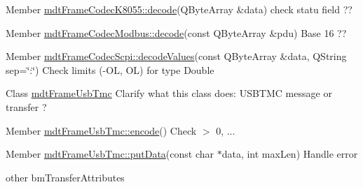 \label{todo__todo000054}
\hypertarget{todo__todo000054}{}
 
\begin{DoxyDescription}
\item[Member \hyperlink{classmdt_frame_codec_k8055_a9dfe60529b0e80d5bbd3852fdea51b18}{mdtFrameCodecK8055::decode}(QByteArray \&data) ]check statu field ?? 
\end{DoxyDescription}

\label{todo__todo000055}
\hypertarget{todo__todo000055}{}
 
\begin{DoxyDescription}
\item[Member \hyperlink{classmdt_frame_codec_modbus_a426f465363a49d70890a462b40677787}{mdtFrameCodecModbus::decode}(const QByteArray \&pdu) ]Base 16 ?? 
\end{DoxyDescription}

\label{todo__todo000056}
\hypertarget{todo__todo000056}{}
 
\begin{DoxyDescription}
\item[Member \hyperlink{classmdt_frame_codec_scpi_a37a1703b6daee6f6bf91c6afb46191b3}{mdtFrameCodecScpi::decodeValues}(const QByteArray \&data, QString sep=\char`\"{}:\char`\"{}) ]Check limits (-\/OL, OL) for type Double 
\end{DoxyDescription}

\label{todo__todo000060}
\hypertarget{todo__todo000060}{}
 
\begin{DoxyDescription}
\item[Class \hyperlink{classmdt_frame_usb_tmc}{mdtFrameUsbTmc} ]Clarify what this class does: USBTMC message or transfer ?
\end{DoxyDescription}

\label{todo__todo000059}
\hypertarget{todo__todo000059}{}
 
\begin{DoxyDescription}
\item[Member \hyperlink{classmdt_frame_usb_tmc_a9406dddfdd70f5dac729b2dbd728de77}{mdtFrameUsbTmc::encode}() ]Check $>$ 0, ... 
\end{DoxyDescription}

\label{todo__todo000057}
\hypertarget{todo__todo000057}{}
 
\begin{DoxyDescription}
\item[Member \hyperlink{classmdt_frame_usb_tmc_a06d2743a113bd2b4cf2ee44014ecd710}{mdtFrameUsbTmc::putData}(const char $\ast$data, int maxLen) ]Handle error 

other bmTransferAttributes 
\end{DoxyDescription}

